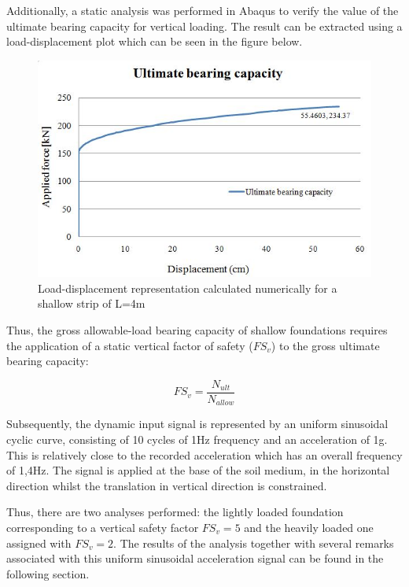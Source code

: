 	Additionally, a static analysis was performed in Abaqus to verify the value of the ultimate bearing capacity for vertical loading. The result can be extracted using a load-displacement plot which can be seen in the figure below.


		\begin{figure}[!h]
			\centering
			\includegraphics[width=0.5\linewidth]{"ultimatebearing"}
			\caption{Load-displacement representation calculated numerically for a shallow strip of L=4m}
			\label{bearing}
		\end{figure}

	Thus, the gross allowable-load bearing capacity of shallow foundations requires the application of a static vertical factor of safety ($FS_v$) to the gross ultimate bearing capacity:
	
\begin{equation}
	FS_v=\frac{N_{ult}}{N_{allow}}
\end{equation}

Subsequently, the dynamic input signal is represented by an uniform sinusoidal cyclic curve, consisting of 10 cycles of 1Hz frequency and an acceleration of 1g. This is relatively close to the recorded acceleration which has an overall frequency of 1,4Hz. The signal is applied at the base of the soil medium, in the horizontal direction whilst the translation in vertical direction is constrained.

Thus, there are two analyses performed: the lightly loaded foundation corresponding to a vertical safety factor $FS_v=5$ and the heavily loaded one assigned with $FS_v=2$. The results of the analysis together with several remarks associated with this uniform sinusoidal acceleration signal can be found in the following section.
	  
